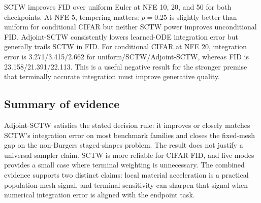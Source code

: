 SCTW improves FID over uniform Euler at NFE 10, 20, and 50 for both checkpoints. At NFE 5,
tempering matters: $p=0.25$ is slightly better than uniform for conditional CIFAR but neither SCTW
power improves unconditional FID. Adjoint-SCTW consistently lowers learned-ODE integration error
but generally trails SCTW in FID. For conditional CIFAR at NFE 20, integration error is
3.271/3.415/2.662 for uniform/SCTW/Adjoint-SCTW, whereas FID is 23.158/21.391/22.113.
This is a useful negative result for the stronger premise that terminally accurate integration
must improve generative quality.

\subsection{Summary of evidence}
\label{sec:summary-evidence}

Adjoint-SCTW satisfies the stated decision rule: it improves or closely matches SCTW's integration
error on most benchmark families and closes the fixed-mesh gap on the non-Burgers staged-shapes
problem. The result does not justify a universal sampler claim. SCTW is more reliable for CIFAR
FID, and five modes provides a small case where terminal weighting is unnecessary. The combined
evidence supports two distinct claims: local material acceleration is a practical population mesh
signal, and terminal sensitivity can sharpen that signal when numerical integration error is
aligned with the endpoint task.
